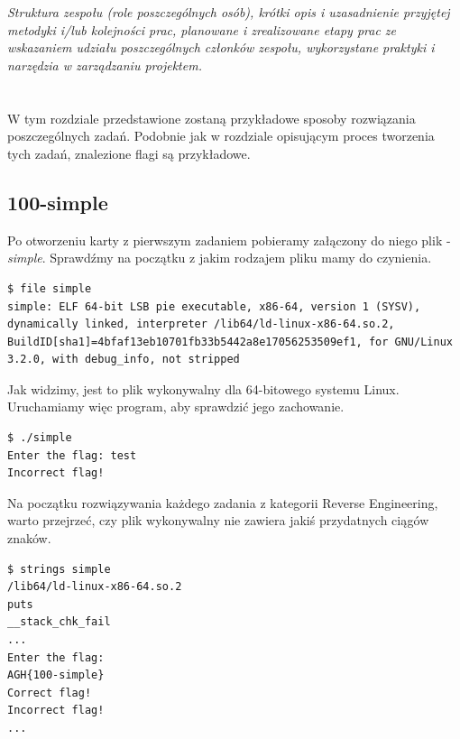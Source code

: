 \documentclass[polish,12pt]{aghthesis}
\begin{document}
\clearpage

\section{\SectionTitleWorkOrganization}
\label{sec:organizacja-pracy}
\emph{Struktura zespołu (role poszczególnych osób), krótki opis i
    uzasadnienie przyjętej metodyki i/lub kolejności prac, planowane i
    zrealizowane etapy prac ze wskazaniem udziału poszczególnych
    członków zespołu, wykorzystane praktyki i narzędzia w zarządzaniu
    projektem.}

\clearpage

\section{\SectionTitleResults}
\label{sec:wyniki-projektu}

W tym rozdziale przedstawione zostaną przykładowe sposoby rozwiązania poszczególnych zadań.
Podobnie jak w rozdziale opisującym proces tworzenia tych zadań, znalezione
flagi są przykładowe.

\subsection{100-simple}

Po otworzeniu karty z pierwszym zadaniem pobieramy załączony do niego plik - \emph{simple}.
Sprawdźmy na początku z jakim rodzajem pliku mamy do czynienia.

\begin{verbatim}
$ file simple
simple: ELF 64-bit LSB pie executable, x86-64, version 1 (SYSV), dynamically linked, interpreter /lib64/ld-linux-x86-64.so.2, BuildID[sha1]=4bfaf13eb10701fb33b5442a8e17056253509ef1, for GNU/Linux 3.2.0, with debug_info, not stripped
\end{verbatim}

Jak widzimy, jest to plik wykonywalny dla 64-bitowego systemu Linux.
Uruchamiamy więc program, aby sprawdzić jego zachowanie.

\begin{verbatim}
$ ./simple
Enter the flag: test
Incorrect flag!
\end{verbatim}

Na początku rozwiązywania każdego zadania z kategorii Reverse Engineering, warto
przejrzeć, czy plik wykonywalny nie zawiera jakiś przydatnych ciągów znaków.

\begin{verbatim}
$ strings simple
/lib64/ld-linux-x86-64.so.2
puts
__stack_chk_fail
...
Enter the flag: 
AGH{100-simple}
Correct flag!
Incorrect flag!
...
\end{verbatim}
\end{document}

